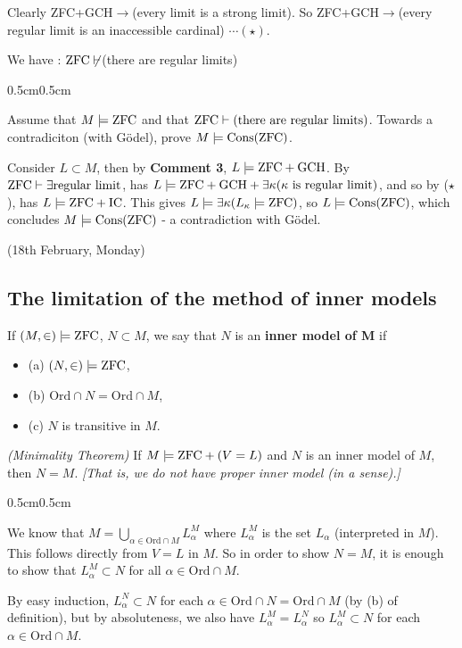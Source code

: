 \documentclass[12pt,a4paper]{article}
\newenvironment{proof}
{\begin{changemargin}{0.5cm}{0.5cm} 
	}%
	{\end{changemargin}
}
\renewenvironment{i}
{\begin{itemize} 
	}%
	{\end{itemize}
}
\newenvironment{p}
{\begin{proof} 
	}%
	{\end{proof}
}
\begin{document}
Clearly ZFC+GCH$\rightarrow$(every limit is a strong limit). So ZFC+GCH$\rightarrow$(every regular limit is an inaccessible cardinal) $\cdots (\star)$.
\s

We have : $\text{ZFC} \not\vdash$(there are regular limits)
\begin{p}
\pf Assume that $M\models \text{ZFC}$ and that $\text{ZFC} \vdash \text{(there are regular limits)}$. Towards a contradiciton (with G\"odel), prove $M\models \text{Cons}(\text{ZFC})$.

\quad Consider $L\subset M$, then by \textbf{Comment 3}, $L\models \text{ZFC} + \text{GCH}$. By $\text{ZFC} \vdash \exists \text{regular limit}$, has $L \models \text{ZFC} + \text{GCH} +\exists \kappa (\kappa\text{ is regular limit})$, and so by ($\star$), has $L\models \text{ZFC} + \text{IC}$. This gives $L \models \exists \kappa (L_{\kappa} \models \text{ZFC})$, so $L\models \text{Cons}(\text{ZFC})$, which concludes $M\models \text{Cons}(\text{ZFC})$ - a contradiction with G\"odel.

\eop
\end{p}
\s

\newday

(18th February, Monday)
\s

\subsection*{The limitation of the method of inner models}

 If $(M, \in) \models \text{ZFC}$, $N\subset M$, we say that $N$ is an \textbf{inner model of M} if
\begin{i}
\item[(a)] $(N, \in) \models \text{ZFC}$,
\item[(b)] $\text{Ord} \cap N = \text{Ord} \cap M$,
\item[(c)] $N$ is transitive in $M$.
\end{i}
\s

\thm \emph{(Minimality Theorem)} If $M \models \text{ZFC} + (V=L)$ and $N$ is an inner model of $M$, then $N=M$. \emph{[That is, we do not have proper inner model (in a sense).]}
\begin{p}
\pf We know that $M = \bigcup_{\alpha \in \text{Ord} \cap M} L_{\alpha}^M$ where $L_{\alpha}^M$ is the set $L_{\alpha}$ (interpreted in $M$). This follows directly from $V=L$ in $M$. So in order to show $N = M$, it is enough to show that $L^M_{\alpha} \subset N$ for all $\alpha \in \text{Ord} \cap M$.

\quad By easy induction, $L_{\alpha}^N \subset N$ for each $\alpha \in \text{Ord} \cap N = \text{Ord} \cap M$ (by (b) of definition), but by absoluteness, we also have $L_{\alpha}^M = L_{\alpha}^N$ so $L_{\alpha}^M \subset N$ for each $\alpha \in \text{Ord} \cap M$.

\eop
\end{p}
\s
\end{document}
